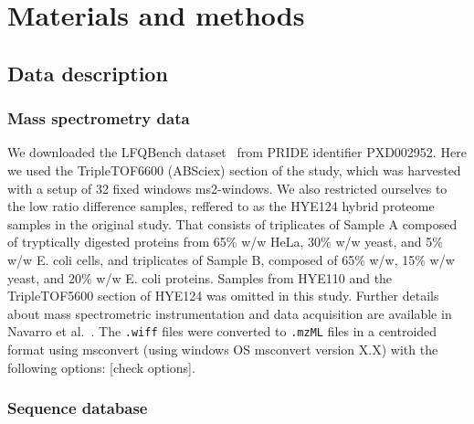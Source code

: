 \documentclass[10pt,letterpaper]{article}
\begin{document}
 

\section*{Materials and methods}


\subsection*{Data description}
\subsubsection*{Mass spectrometry data}


We downloaded the LFQBench dataset~\cite{navarro2016multicenter} from PRIDE identifier PXD002952. Here we used the TripleTOF6600 (ABSciex) section of the study, which was harvested with a setup of 32 fixed windows ms2-windows.  We also restricted ourselves to the low ratio difference samples, reffered to as the HYE124 hybrid proteome samples in the original study. That consists of triplicates of Sample A composed of tryptically digested proteins from 65\% w/w HeLa, 30\% w/w yeast, and 5\% w/w E. coli cells, and triplicates of Sample B, composed of 65\% w/w, 15\% w/w yeast, and 20\% w/w E. coli proteins. Samples from HYE110 and the TripleTOF5600 section of HYE124 was omitted in this study. Further details about mass spectrometric instrumentation and data acquisition are available in Navarro et al.~\cite{navarro2016multicenter}.    
The \verb|.wiff| files were converted to \verb|.mzML| files in a centroided format using msconvert (using windows OS msconvert version X.X) with the following options: [check options]. 


\subsubsection*{Sequence database}
\end{document}
